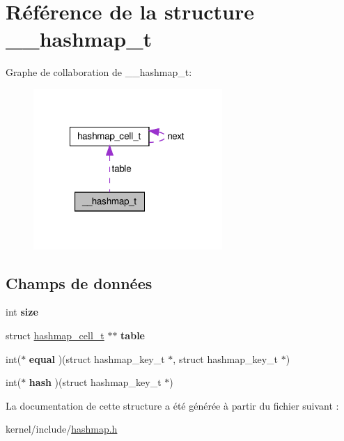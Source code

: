 \hypertarget{struct____hashmap__t}{\section{Référence de la structure \-\_\-\-\_\-hashmap\-\_\-t}
\label{struct____hashmap__t}
}


Graphe de collaboration de \-\_\-\-\_\-hashmap\-\_\-t\-:
\nopagebreak
\begin{figure}[H]
\begin{center}
\leavevmode
\includegraphics[width=203pt]{struct____hashmap__t__coll__graph}
\end{center}
\end{figure}
\subsection*{Champs de données}
\begin{DoxyCompactItemize}
\item 
\hypertarget{struct____hashmap__t_ab5f1e74c3fcf71ee4ac91a860cbcde19}{int {\bfseries size}}\label{struct____hashmap__t_ab5f1e74c3fcf71ee4ac91a860cbcde19}

\item 
\hypertarget{struct____hashmap__t_ac7d3b722978b8bafab2ce2a923b747aa}{struct \hyperlink{structhashmap__cell__t}{hashmap\-\_\-cell\-\_\-t} $\ast$$\ast$ {\bfseries table}}\label{struct____hashmap__t_ac7d3b722978b8bafab2ce2a923b747aa}

\item 
\hypertarget{struct____hashmap__t_a2b730301a68342f67a406ce1b6c2a826}{int($\ast$ {\bfseries equal} )(struct hashmap\-\_\-key\-\_\-t $\ast$, struct hashmap\-\_\-key\-\_\-t $\ast$)}\label{struct____hashmap__t_a2b730301a68342f67a406ce1b6c2a826}

\item 
\hypertarget{struct____hashmap__t_aa56e33c3baa182a530a4a8bfc27c11f1}{int($\ast$ {\bfseries hash} )(struct hashmap\-\_\-key\-\_\-t $\ast$)}\label{struct____hashmap__t_aa56e33c3baa182a530a4a8bfc27c11f1}

\end{DoxyCompactItemize}


La documentation de cette structure a été générée à partir du fichier suivant \-:\begin{DoxyCompactItemize}
\item 
kernel/include/\hyperlink{hashmap_8h}{hashmap.\-h}\end{DoxyCompactItemize}
